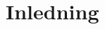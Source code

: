 \documentclass[a4paper]{article}
\begin{document}
\vspace{3mm}

\section{Inledning}

%
\end{document}

